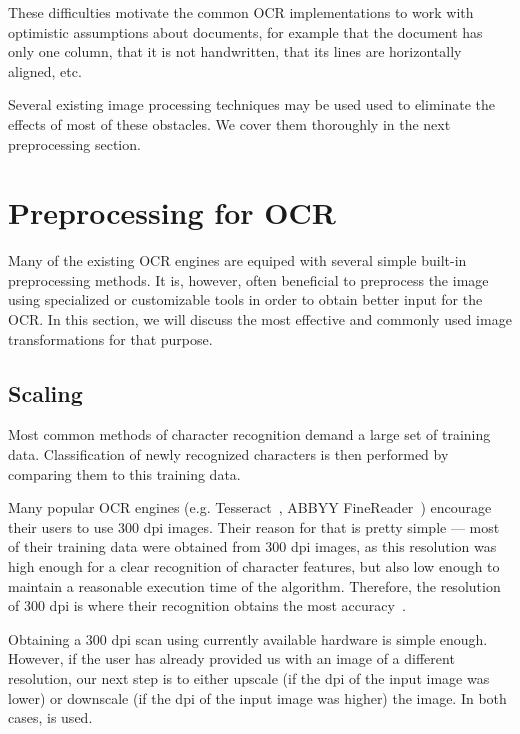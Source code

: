 These difficulties motivate the common OCR implementations to work with optimistic assumptions about documents, for example that the document has only one column, that it is not handwritten, that its lines are horizontally aligned, etc.

Several existing image processing techniques may be used used to eliminate the effects of most of
these obstacles.  We cover them thoroughly in the next preprocessing section.

\section{Preprocessing for OCR}

Many of the existing OCR engines are equiped with several simple built-in preprocessing methods. It is, however, often beneficial to preprocess the image using specialized or customizable tools in order to obtain better input for the OCR. In this section, we will discuss the most effective and commonly used image transformations for that purpose.

\subsection{Scaling}



Most common methods of character recognition demand a large set of training data. Classification of newly recognized characters is then performed by comparing them to this training data.

Many popular OCR engines (e.g. Tesseract~\cite{TesseractQual}, ABBYY FineReader~\cite{ABBYYdpi}) encourage their users to use 300 dpi images. Their reason for that is pretty simple --- most of their training data were obtained from 300 dpi images, as this resolution was high enough for a clear recognition of character features, but also low enough to maintain a reasonable execution time of the algorithm. Therefore, the resolution of 300 dpi is where their recognition obtains the most accuracy~\cite{preprocessAll}. 

Obtaining a 300 dpi scan using currently available hardware is simple enough. However, if the user has already provided us with an image of a different resolution, our next step is to either upscale (if the dpi of the input image was lower) or downscale (if the dpi of the input image was higher) the image. In both cases,  is used. 

